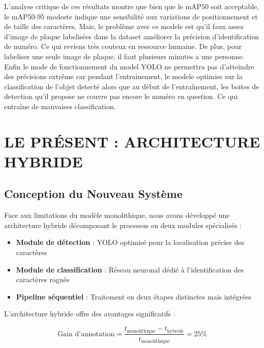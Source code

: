 \documentclass[letterpaper, 10 pt, conference]{ieeeconf}  %
\begin{document}
L'analyse critique de ces résultats montre que bien que le mAP50 soit acceptable,
le mAP50-95 modeste indique une sensibilité aux variations de positionnement
et de taille des caractères.
Mais, le problème avec ce modele est qu'il faux assez d'image de plaque
labelisées dans la dataset améliorer la précision d'identification de numéro.
Ce qui reviens très couteux en ressource humaine. De plus, pour labeliser
une seule image de plaque, il faut plusieurs minutes a une personne.
Enfin le mode de fonctionnement du model YOLO ne permettra pas d'atteindre
des précisions extrême car pendant l'entrainement, le modele optimise
sur la classification de l'objet detecté alors que au début de l'entraînement,
les boites de detection qu'il propose ne couvre pas encore le numéro
en question. Ce qui entraîne de mauvaises classification.

\section{LE PRÉSENT : ARCHITECTURE HYBRIDE}

\subsection{Conception du Nouveau Système}

Face aux limitations du modèle monolithique, nous avons développé une architecture hybride décomposant le processus en deux modules spécialisés :

\begin{itemize}
\item \textbf{Module de détection} : YOLO optimisé pour la localisation précise des caractères
\item \textbf{Module de classification} : Réseau neuronal dédié à l'identification des caractères rognés
\item \textbf{Pipeline séquentiel} : Traitement en deux étapes distinctes mais intégrées
\end{itemize}

L'architecture hybride offre des avantages significatifs :

\begin{equation}
\text{Gain d'annotation} = \frac{t_{\text{monolithique}} - t_{\text{hybride}}}{t_{\text{monolithique}}} = 25\%
\end{equation}
\end{document}
